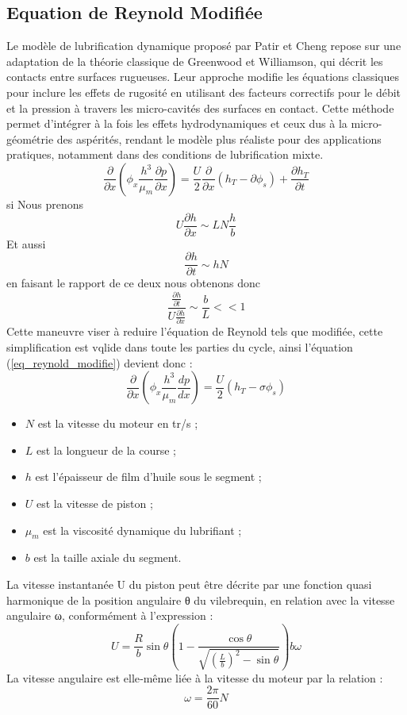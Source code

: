 \subsection{Equation de Reynold Modifiée}
Le modèle de lubrification dynamique proposé par Patir et Cheng repose sur une adaptation de la théorie classique de Greenwood et Williamson, qui décrit les contacts entre surfaces rugueuses. Leur approche modifie les équations classiques pour inclure les effets de rugosité en utilisant des facteurs correctifs pour le débit et la pression à travers les micro-cavités des surfaces en contact. Cette méthode permet d'intégrer à la fois les effets hydrodynamiques et ceux dus à la micro-géométrie des aspérités, rendant le modèle plus réaliste pour des applications pratiques, notamment dans des conditions de lubrification mixte.\cite{tribo1}
\begin{equation}
	\frac{\partial}{\partial x}(\phi_{x} \frac{h^3}{\mu_{m}} \frac{\partial p}{\partial x}) = \frac{U}{2} \frac{\partial}{\partial x}(h_{T}-\partial \phi_{s})+\frac{\partial h_{T}}{\partial t}
	\label{eq_reynold_modifie}
\end{equation}
si Nous prenons 
$$ U \frac{\partial h}{\partial x} \sim LN \frac{h}{b}$$
Et aussi 
$$\frac{\partial h}{\partial t} \sim hN $$
en faisant le rapport de ce deux nous obtenons donc 
$$ \frac{\frac{\partial h}{\partial t}}{U\frac{\partial h}{\partial x}} \sim \frac{b}{L}<< 1 $$
Cette maneuvre viser à reduire l'équation de Reynold tels que modifiée, cette simplification est vqlide dans toute les parties du cycle, ainsi l'équation (\ref{eq_reynold_modifie}) devient donc :
\begin{equation}
	\frac{\partial}{\partial x}\left(\phi_{x} \frac{h^3}{\mu_{m}} \frac{dp}{dx}\right) =\frac{U}{2}\left(h_{T}-\sigma \phi_{s}\right)
	\label{eq_reynold_simplifie}
\end{equation}
\begin{itemize}
	\item $N$ est la vitesse du moteur en tr/s ;
	\item $L$ est la longueur de la course ;
	\item $h$ est l'épaisseur de film d'huile sous le segment ;
	\item $U$ est la vitesse de piston ;
	\item $\mu_{m}$ est la viscosité dynamique du lubrifiant ;
	\item $b$ est la taille axiale du segment.
\end{itemize}
La vitesse instantanée U du piston peut être décrite par une fonction quasi harmonique de la position angulaire θ du vilebrequin, en relation avec la vitesse angulaire ω, conformément à l'expression :
\begin{equation}
	U =\frac{R}{b}\sin{\theta} \left(1-\frac{\cos\theta}{\sqrt{(\frac{L}{b})^2-\sin\theta}}\right)b\omega
\end{equation}
La vitesse angulaire est elle‐même liée à la vitesse du moteur par la relation :
\begin{equation}
	\omega =\frac{2\pi}{60}N
\end{equation}
